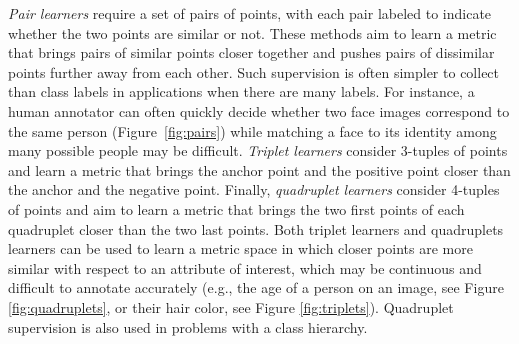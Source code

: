\documentclass[twoside,11pt]{article}
\begin{document}
\emph{Pair learners} require a set of pairs of points, with each pair labeled to indicate whether the two points are similar or not.
These methods aim to learn a metric that brings pairs of similar points closer together and pushes pairs of dissimilar points further away from each other.
Such supervision is often simpler to collect than class labels in applications when there are many labels. %
For instance, a human annotator can often quickly decide whether two face images correspond to the same person (Figure~\ref{fig:pairs}) while matching a face to its identity among many possible people may be difficult. 
\emph{Triplet learners} consider 3-tuples of points and learn a metric that brings the anchor point and the positive point closer than the anchor and the negative point.
Finally, \emph{quadruplet learners} consider 4-tuples of points and aim to learn a metric that brings the two first points of each quadruplet closer than the two last points.
Both triplet learners and quadruplets learners can be used to learn a metric space in which closer points are more similar with respect to an attribute of interest, which may be continuous and difficult to annotate accurately (e.g., the age of a person on an image, see Figure \ref{fig:quadruplets}, or their hair color, see Figure \ref{fig:triplets}).
Quadruplet supervision is also used in problems with a class hierarchy.
\end{document}
